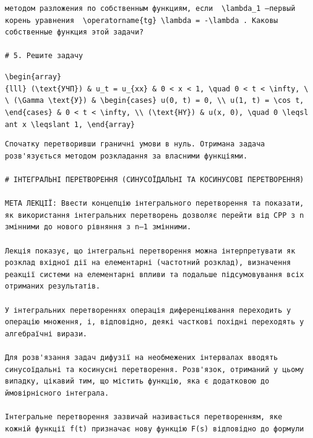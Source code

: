 \documentclass[
  ukrainian,
]{article}
\begin{document}
\begin{verbatim}
методом разложения по собственным функциям, если  \lambda_1 —первый корень уравнения  \operatorname{tg} \lambda = -\lambda . Каковы собственные функция этой задачи?

# 5. Решите задачу
\end{verbatim}

\texttt{\textbackslash{}begin\{array\}\{lll\}\ (\textbackslash{}text\{УЧП\})\ \&\ u\_t\ =\ u\_\{xx\}\ \&\ 0\ \textless{}\ x\ \textless{}\ 1,\ \textbackslash{}quad\ 0\ \textless{}\ t\ \textless{}\ \textbackslash{}infty,\ \textbackslash{}\textbackslash{}\ (\textbackslash{}Gamma\ \textbackslash{}text\{У\})\ \&\ \textbackslash{}begin\{cases\}\ u(0,\ t)\ =\ 0,\ \textbackslash{}\textbackslash{}\ u(1,\ t)\ =\ \textbackslash{}cos\ t,\ \textbackslash{}end\{cases\}\ \&\ 0\ \textless{}\ t\ \textless{}\ \textbackslash{}infty,\ \textbackslash{}\textbackslash{}\ (\textbackslash{}text\{HY\})\ \&\ u(x,\ 0),\ \textbackslash{}quad\ 0\ \textbackslash{}leqslant\ x\ \textbackslash{}leqslant\ 1,\ \textbackslash{}end\{array\}}

\begin{verbatim}
Спочатку перетворивши граничні умови в нуль. Отримана задача розв'язується методом розкладання за власними функціями.

# ІНТЕГРАЛЬНІ ПЕРЕТВОРЕННЯ (СИНУСОЇДАЛЬНІ ТА КОСИНУСОВІ ПЕРЕТВОРЕННЯ)

МЕТА ЛЕКЦІЇ: Ввести концепцію інтегрального перетворення та показати, як використання інтегральних перетворень дозволяє перейти від CPP з n змінними до нового рівняння з n—1 змінними.

Лекція показує, що інтегральні перетворення можна інтерпретувати як розклад вхідної дії на елементарні (частотний розклад), визначення реакції системи на елементарні впливи та подальше підсумовування всіх отриманих результатів.

У інтегральних перетвореннях операція диференціювання переходить у операцію множення, і, відповідно, деякі часткові похідні переходять у алгебраїчні вирази.

Для розв'язання задач дифузії на необмежених інтервалах вводять синусоїдальні та косинусні перетворення. Розв'язок, отриманий у цьому випадку, цікавий тим, що містить функцію, яка є додатковою до ймовірнісного інтеграла.

Інтегральне перетворення зазвичай називається перетворенням, яке кожній функції f(t) призначає нову функцію F(s) відповідно до формули
\end{verbatim}
\end{document}

